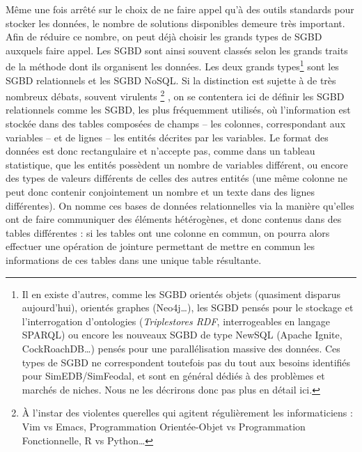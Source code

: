 Même une fois arrêté sur le choix de ne faire appel qu'à des outils standards pour stocker les données, le nombre de solutions disponibles demeure très important.
Afin de réduire ce nombre, on peut déjà choisir les grands types de SGBD auxquels faire appel.
Les SGBD sont ainsi souvent classés selon les grands traits de la méthode dont ils organisent les données.
Les deux grands types\footnote{
	Il en existe d'autres, comme les SGBD orientés objets (quasiment disparus aujourd'hui), orientés graphes (Neo4j\ldots), les SGBD pensés pour le stockage et l'interrogation d'ontologies (\textit{Triplestores RDF}, interrogeables en langage SPARQL) ou encore les nouveaux SGBD de type \og NewSQL \fg{} (Apache Ignite, CockRoachDB\ldots) pensés pour une parallélisation massive des données. Ces types de SGBD ne correspondent toutefois pas du tout aux besoins identifiés pour SimEDB/SimFeodal, et sont en général dédiés à des problèmes et marchés de niches. Nous ne les décrirons donc pas plus en détail ici.
} sont les SGBD \og relationnels\fg{} et les SGBD \og NoSQL\fg{}.
Si la distinction est sujette à de très nombreux débats, souvent virulents
\footnote{
	À l'instar des violentes querelles qui agitent régulièrement les informaticiens : Vim vs Emacs, Programmation Orientée-Objet vs Programmation Fonctionnelle, R vs Python\ldots
}
, on se contentera ici de définir les SGBD relationnels comme les SGBD, les plus fréquemment utilisés, où l'information est stockée dans des tables composées de champs -- les colonnes, correspondant aux variables -- et de lignes -- les entités décrites par les variables.
Le format des données est donc rectangulaire et n'accepte pas, comme dans un tableau statistique, que les entités possèdent un nombre de variables différent, ou encore des types de valeurs différents de celles des autres entités (une même colonne ne peut donc contenir conjointement un nombre et un texte dans des lignes différentes).
On nomme ces bases de données relationnelles via la manière qu'elles ont de faire communiquer des éléments hétérogènes, et donc contenus dans des tables différentes : si les tables ont une colonne en commun, on pourra alors effectuer une opération de jointure permettant de mettre en commun les informations de ces tables dans une unique table résultante.

